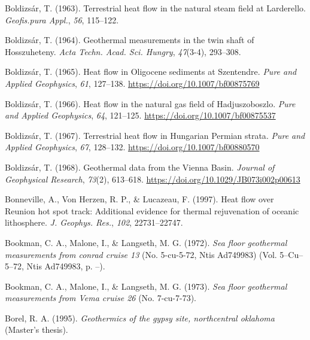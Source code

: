 \begin{CSLReferences}{1}{1}
\leavevmode{}%
Boldizsár, T. (1963). Terrestrial heat flow in the natural steam field at {Larderello}. \emph{Geofis.pura Appl.}, \emph{56}, 115--122.

\leavevmode{}%
Boldizsár, T. (1964). Geothermal measurements in the twin shaft of {Hosszuheteny}. \emph{Acta Techn. Acad. Sci. Hungry}, \emph{47}(3-4), 293--308.

\leavevmode{}%
Boldizsár, T. (1965). Heat flow in {Oligocene} sediments at {Szentendre}. \emph{Pure and Applied Geophysics}, \emph{61}, 127--138. \url{https://doi.org/10.1007/bf00875769}

\leavevmode{}%
Boldizsár, T. (1966). Heat flow in the natural gas field of {Hadjuszoboszlo}. \emph{Pure and Applied Geophysics}, \emph{64}, 121--125. \url{https://doi.org/10.1007/bf00875537}

\leavevmode{}%
Boldizsár, T. (1967). Terrestrial heat flow in {Hungarian Permian strata}. \emph{Pure and Applied Geophysics}, \emph{67}, 128--132. \url{https://doi.org/10.1007/bf00880570}

\leavevmode{}%
Boldizsár, T. (1968). Geothermal data from the {Vienna Basin}. \emph{Journal of Geophysical Research}, \emph{73}(2), 613--618. \url{https://doi.org/10.1029/JB073i002p00613}

\leavevmode{}%
Bonneville, A., Von Herzen, R. P., \& Lucazeau, F. (1997). Heat flow over {Reunion} hot spot track: Additional evidence for thermal rejuvenation of oceanic lithosphere. \emph{J. Geophys. Res.}, \emph{102}, 22731--22747.

\leavevmode{}%
Bookman, C. A., Malone, I., \& Langseth, M. G. (1972). \emph{Sea floor geothermal measurements from conrad cruise 13} (No. 5-cu-5-72, Ntis Ad749983) (Vol. 5--Cu--5--72, Ntis Ad749983, p. --).

\leavevmode{}%
Bookman, C. A., Malone, I., \& Langseth, M. G. (1973). \emph{Sea floor geothermal measurements from {Vema} cruise 26} (No. 7-cu-7-73).

\leavevmode{}%
Borel, R. A. (1995). \emph{Geothermics of the gypsy site, northcentral oklahoma} (Master's thesis).


\end{CSLReferences}

